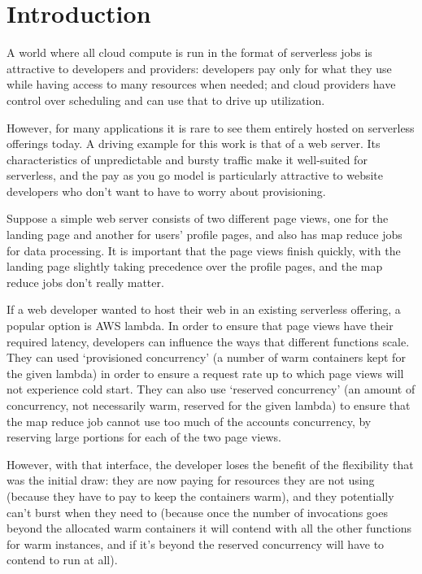 \section{Introduction}

A world where all cloud compute is run in the format of serverless jobs is
attractive to developers and providers: developers pay only for what they use
while having access to many resources when needed; and cloud providers have
control over scheduling and can use that to drive up utilization.


However, for many applications it is rare to see them entirely hosted on
serverless offerings today\cite{TODO}. A driving example for this work is that
of a web server. Its characteristics of unpredictable and bursty traffic make it
well-suited for serverless, and the pay as you go model is particularly
attractive to website developers who don't want to have to worry about
provisioning.

Suppose a simple web server consists of two different page views, one for the
landing page and another for users' profile pages, and also has map reduce jobs
for data processing. It is important that the page views finish quickly, with
the landing page slightly taking precedence over the profile pages, and the map
reduce jobs don't really matter.

If a web developer wanted to host their web in an existing serverless offering,
a popular option is AWS lambda\cite{TODO}. In order to  ensure that page views
have their required latency, developers can influence the ways that different
functions scale\cite{TODO}. They can used `provisioned concurrency' (a number of
warm containers kept for the given lambda) in order to ensure a request rate up
to which page views will not experience cold start. They can also use `reserved
concurrency' (an amount of concurrency, not necessarily warm, reserved for the
given lambda) to ensure that the map reduce job cannot use too much of the
accounts concurrency, by reserving large portions for each of the two page
views.

However, with that interface, the developer loses the benefit of the flexibility
that was the initial draw: they are now paying for resources they are not using
(because they have to pay to keep the containers warm), and they potentially
can't burst when they need to (because once the number of invocations goes
beyond the allocated warm containers it will contend with all the other
functions for warm instances, and if it's beyond the reserved concurrency will
have to contend to run at all).

